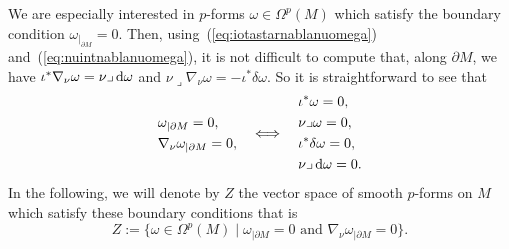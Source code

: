 \documentclass[pdftex]{sigma}
\numberwithin{equation}{section}
\theoremstyle{definition}
\begin{document}
We are especially interested in $p$-forms $\omega\in\Omega^p(M)$ which satisfy the boundary condition $\omega_{|_{\partial M}}=0$.
Then, using~(\ref{eq:iotastarnablanuomega}) and~(\ref{eq:nuintnablanuomega}), it is not difficult to compute that, along $\partial M$, we have $\iota^*\nabla_\nu\omega=\nu\lrcorner\,{\rm d}\omega$ and $\nu\lrcorner\nabla_\nu\omega=-\iota^*\delta\omega$.
So it is straightforward to see that
\begin{equation}\label{Zcharacterization}
\begin{aligned}
&\omega_{|\partial M} = 0,\\
&\nabla_\nu\omega_{|\partial M} = 0,
\end{aligned}
\quad\Longleftrightarrow\quad
\begin{aligned}
& \iota^*\omega = 0,\\
& \nu\lrcorner\omega = 0,\\
& \iota^*\delta\omega = 0,\\
& \nu\lrcorner\,{\rm d}\omega = 0.
\end{aligned}
\end{equation}
In the following, we will denote by $Z$ the vector space of smooth $p$-forms on $M$ which satisfy these boundary conditions that is
\begin{equation*}%
Z:=\big\{\omega\in\Omega^p(M)\mid \omega_{|\partial M} = 0\text{ and }\nabla_\nu\omega_{|\partial M} = 0\big\}.
\end{equation*}
\end{document}
